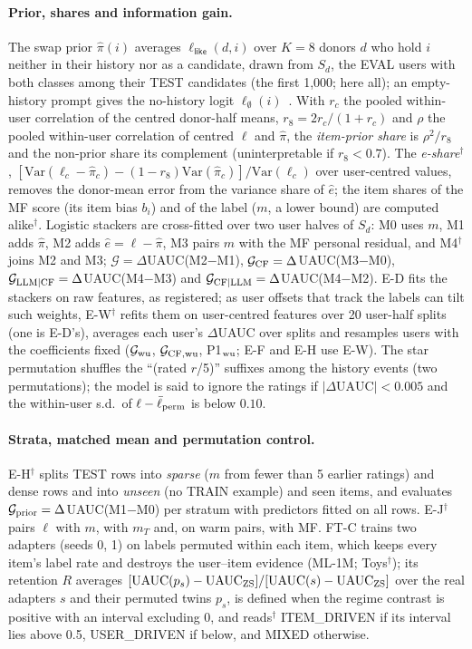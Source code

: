 \paragraph{Prior, shares and information gain.}
The swap prior $\hat\pi(i)$ averages $\ell_{\textsf{like}}(d,i)$ over $K=8$ donors $d$ who hold $i$ neither in their history nor as a
candidate, drawn from $S_d$, the EVAL users with both classes among their TEST candidates (the first 1,000; here all); an
empty-history prompt gives the no-history logit $\ell_\emptyset(i)$~\citep{holtzman2021surface}. With $r_c$ the pooled within-user
correlation of the centred donor-half means, $r_8=2r_c/(1+r_c)$ and $\rho$ the pooled within-user correlation of centred $\ell$ and
$\hat\pi$, the \emph{item-prior share} is $\rho^2/r_8$ and the non-prior share its complement (uninterpretable if $r_8<0.7$). The
\emph{e-share}$^\dagger$, $[\mathrm{Var}(\ell_c-\hat\pi_c)-(1-r_8)\mathrm{Var}(\hat\pi_c)]/\mathrm{Var}(\ell_c)$ over user-centred
values, removes the donor-mean error from the variance share of $\hat e$; the item shares of the MF score (its item bias $b_i$) and
of the label ($m$, a lower bound) are computed alike$^\dagger$. Logistic stackers are cross-fitted over two user halves of $S_d$: M0
uses $m$, M1 adds $\hat\pi$, M2 adds $\hat e=\ell-\hat\pi$, M3 pairs $m$ with the MF personal residual, and M4$^\dagger$ joins M2 and
M3; $\mathcal G=\Delta$UAUC(M2$-$M1), $\mathcal G_{\rm CF}=\Delta$UAUC(M3$-$M0), $\mathcal G_{\rm LLM|CF}=\Delta$UAUC(M4$-$M3) and
$\mathcal G_{\rm CF|LLM}=\Delta$UAUC(M4$-$M2). E-D fits the stackers on raw features, as registered; as user offsets that track the
labels can tilt such weights, E-W$^\dagger$ refits them on user-centred features over 20 user-half splits (one is E-D's), averages
each user's $\Delta$UAUC over splits and resamples users with the coefficients fixed ($\mathcal G_{\rm wu}$, $\mathcal G_{\rm CF,wu}$,
P1$_{\rm wu}$; E-F and E-H use E-W). The star permutation shuffles the ``(rated $r$/5)'' suffixes among the history events (two
permutations); the model is said to ignore the ratings if $|\Delta\mathrm{UAUC}|<0.005$ and the within-user s.d.\ of
$\ell-\bar\ell_{\rm perm}$ is below $0.10$.

\paragraph{Strata, matched mean and permutation control.}
E-H$^\dagger$ splits TEST rows into \emph{sparse} ($m$ from fewer than 5 earlier ratings) and dense rows and into \emph{unseen} (no
TRAIN example) and seen items, and evaluates $\mathcal G_{\rm prior}=\Delta$UAUC(M1$-$M0) per stratum with predictors fitted on all
rows. E-J$^\dagger$ pairs $\ell$ with $m$, with $m_T$ and, on warm pairs, with MF. FT-C trains two adapters (seeds 0, 1) on labels
permuted within each item, which keeps every item's label rate and destroys the user--item evidence (ML-1M; Toys$^\dagger$); its
retention $R$ averages $[\mathrm{UAUC}(p_s)-\mathrm{UAUC}_{\rm ZS}]/[\mathrm{UAUC}(s)-\mathrm{UAUC}_{\rm ZS}]$ over the real adapters
$s$ and their permuted twins $p_s$, is defined when the regime contrast is positive with an interval excluding 0, and reads$^\dagger$
ITEM\_DRIVEN if its interval lies above 0.5, USER\_DRIVEN if below, and MIXED otherwise.

